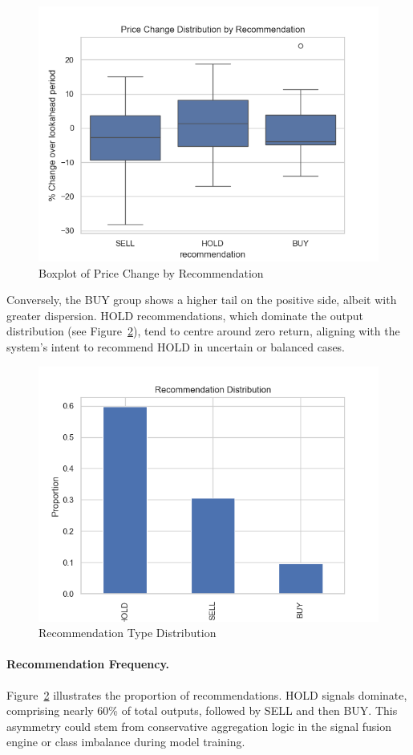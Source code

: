 \begin{figure}[h]
  \centering
  \includegraphics[width=0.6\linewidth]{assets/price_change_distribution_by_recommendation.png}
  \caption{Boxplot of Price Change by Recommendation}
  \label{fig:box}
\end{figure}

\FloatBarrier

Conversely, the BUY group shows a higher tail on the positive side, albeit with greater dispersion. HOLD recommendations, which dominate the output distribution (see Figure~\ref{fig:rec_dist}), tend to centre around zero return, aligning with the system's intent to recommend HOLD in uncertain or balanced cases.

\begin{figure}[h]
  \centering
  \includegraphics[width=0.6\linewidth]{assets/recommendation_distribution.png}
  \caption{Recommendation Type Distribution}
  \label{fig:rec_dist}
\end{figure}

\paragraph{Recommendation Frequency.}  
Figure~\ref{fig:rec_dist} illustrates the proportion of recommendations. HOLD signals dominate, comprising nearly 60\% of total outputs, followed by SELL and then BUY. This asymmetry could stem from conservative aggregation logic in the signal fusion engine or class imbalance during model training.

